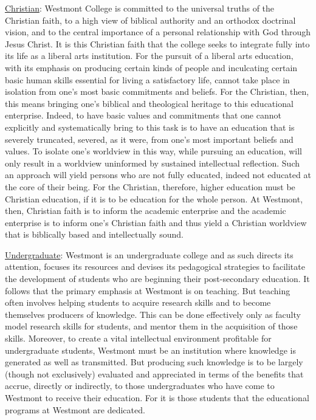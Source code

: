 \documentclass[letterpaper, 11pt]{article}
\begin{document}
\underline{Christian}:  Westmont College is committed to the universal truths of the Christian faith, to a high view of biblical authority and an orthodox doctrinal vision, and to the central importance of a personal relationship with God through Jesus Christ.  It is this Christian faith that the college seeks to integrate fully into its life as a liberal arts institution.  For the pursuit of a liberal arts education, with its emphasis on producing certain kinds of people and inculcating certain basic human skills essential for living a satisfactory life, cannot take place in isolation from one's most basic commitments and beliefs.  For the Christian, then, this means bringing one's biblical and theological heritage to this educational enterprise. Indeed, to have basic values and commitments that one cannot explicitly and systematically bring to this task is to have an education that is severely truncated, severed, as it were, from one's most important beliefs and values.  To isolate one's worldview in this way, while pursuing an education, will only result in a worldview uninformed by sustained intellectual reflection.  Such an approach will yield persons who are not fully educated, indeed not educated at the core of their being.  For the Christian, therefore, higher education must be Christian education, if it is to be education for the whole person.  At Westmont, then, Christian faith is to inform the academic enterprise and the academic enterprise is to inform one's Christian faith and thus yield a Christian worldview that is biblically based and intellectually sound. 

 \underline{Undergraduate}:  Westmont is an undergraduate college and as such directs its attention, focuses its resources and devises its pedagogical strategies to facilitate the development of students who are beginning their post-secondary education.  It follows that the primary emphasis at Westmont is on teaching.  But teaching often involves helping students to acquire research skills and to become themselves producers of knowledge.  This can be done effectively only as faculty model research skills for students, and mentor them in the acquisition of those skills.  Moreover, to create a vital intellectual environment profitable for undergraduate students, Westmont must be an institution where knowledge is generated as well as transmitted.  But producing such knowledge is to be largely (though not exclusively) evaluated and appreciated in terms of the benefits that accrue, directly or indirectly, to those undergraduates who have come to Westmont to receive their education. For it is those students that the educational programs at Westmont are dedicated.
 
\end{document}
